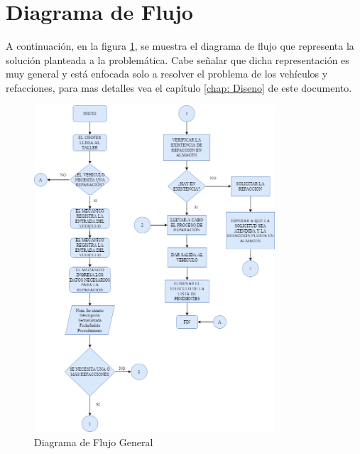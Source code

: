 \section{Diagrama de Flujo}
A continuación, en la figura \ref{fig: Diagrama de Flujo General}, se muestra el diagrama de flujo que representa la solución planteada a la problemática. Cabe señalar que dicha representación es muy general y está enfocada solo a resolver el problema de los vehículos y refacciones, para mas detalles vea el capítulo \ref{chap: Diseno} de este documento.
\begin{figure}[!h]
	\centering
	\includegraphics[width=0.8\textwidth]{./diagramaFlujo/imagenes/DiagramadeFlujo}
	\caption{Diagrama de Flujo General}
	\label{fig: Diagrama de Flujo General}
\end{figure}